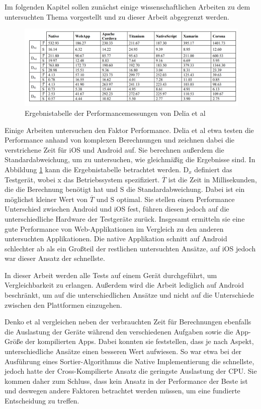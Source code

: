 Im folgenden Kapitel sollen zunächst einige wissenschaftlichen Arbeiten zu dem untersuchten Thema vorgestellt und zu dieser Arbeit abgegrenzt werden.

\begin{figure}[ht]
  \centering
  \includegraphics[width=\textwidth,keepaspectratio]{images/IEEE_Delia_Al.png}
  \caption[Ergebnistabelle der Performancemessungen von Delia et al]{Ergebnistabelle der Performancemessungen von Delia et al \cite{IEEE_development_classes}}
  \label{fig:result_table_IEEE_related_work}
\end{figure}

Einige Arbeiten untersuchen den Faktor Performance. Delia et al \cite{IEEE_development_classes} etwa testen die Performance anhand von komplexen Berechnungen und zeichnen dabei die verstrichene Zeit für iOS und Android auf. Sie berechnen außerdem die Standardabweichung, um zu untersuchen, wie gleichmäßig die Ergebnisse sind. In Abbildung \ref{fig:result_table_IEEE_related_work} kann die Ergebnistabelle betrachtet werden. D$_x$ definiert das Testgerät, wobei x das Betriebssystem spezifiziert. $\overline T$ ist die Zeit in Millisekunden, die die Berechnung benötigt hat und S die Standardabweichung. Dabei ist ein möglichst kleiner Wert von $\overline T$ und S optimal. Sie stellen einen Performance Unterschied zwischen Android und iOS fest, führen diesen jedoch auf die unterschiedliche Hardware der Testgeräte zurück. Insgesamt ermitteln sie eine gute Performance von Web-Applikationen im Vergleich zu den anderen untersuchten Applikationen. Die native Applikation schnitt auf Android schlechter ab als ein Großteil der restlichen untersuchten Ansätze, auf iOS jedoch war dieser Ansatz der schnellste.

In dieser Arbeit werden alle Tests auf einem Gerät durchgeführt, um Vergleichbarkeit zu erlangen. Außerdem wird die Arbeit lediglich auf Android beschränkt, um auf die unterschiedlichen Ansätze und nicht auf die Unterschiede zwischen den Plattformen einzugehen.
 
Denko et al \cite{Denko_performance} vergleichen neben der verbrauchten Zeit für Berechnungen ebenfalls die Auslastung der Geräte während den verschiedenen Aufgaben sowie die App-Größe der kompilierten Apps. Dabei konnten sie feststellen, dass je nach Aspekt, unterschiedliche Ansätze einen besseren Wert aufwiesen. So war etwa bei der Ausführung eines Sortier-Algorithmus die Native Implementierung die schnellste, jedoch hatte der Cross-Kompilierte Ansatz die geringste Auslastung der CPU. Sie kommen daher zum Schluss, dass kein Ansatz in der Performance der Beste ist und deswegen andere Faktoren betrachtet werden müssen, um eine fundierte Entscheidung zu treffen.

